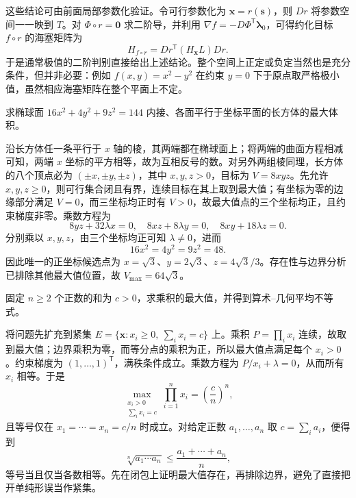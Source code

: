 这些结论可由前面局部参数化验证。令可行参数化为 $\boldsymbol x=r(\boldsymbol s)$，则 $Dr$ 将参数空间一一映到 $T$。对 $\Phi\circ r=\boldsymbol0$ 求二阶导，并利用 $\nabla f=-D\Phi^{\mathsf T}\boldsymbol\lambda_0$，可得约化目标 $f\circ r$ 的海塞矩阵为
\[
    H_{f\circ r}=Dr^{\mathsf T}(H_{\boldsymbol x}L)Dr.
\]
于是通常极值的二阶判别直接给出上述结论。整个空间上正定或负定当然也是充分条件，但并非必要：例如 $f(x,y)=x^2-y^2$ 在约束 $y=0$ 下于原点取严格极小值，虽然相应海塞矩阵在整个平面上不定。

\begin{example}
\label{ex:ellipsoid-inscribed-box-ch14}
求椭球面 $16x^2+4y^2+9z^2=144$ 内接、各面平行于坐标平面的长方体的最大体积。
\end{example}
\begin{solve}
沿长方体任一条平行于 $x$ 轴的棱，其两端都在椭球面上；将两端的曲面方程相减可知，两端 $x$ 坐标的平方相等，故为互相反号的数。对另外两组棱同理，长方体的八个顶点必为 $(\pm x,\pm y,\pm z)$，其中 $x,y,z>0$，目标为 $V=8xyz$。先允许 $x,y,z\geq0$，则可行集合闭且有界，连续目标在其上取到最大值；有坐标为零的边缘部分满足 $V=0$，而三坐标均正时有 $V>0$，故最大值点的三个坐标均正，且约束梯度非零。乘数方程为
\[
    8yz+32\lambda x=0,\quad
    8xz+8\lambda y=0,\quad
    8xy+18\lambda z=0.
\]
分别乘以 $x,y,z$，由三个坐标均正可知 $\lambda\ne0$，进而
\[
    16x^2=4y^2=9z^2=48.
\]
因此唯一的正坐标候选点为 $x=\sqrt3$、$y=2\sqrt3$、$z=4\sqrt3/3$。存在性与边界分析已排除其他最大值位置，故 $V_{\max}=64\sqrt3$。
\end{solve}

\begin{example}
\label{ex:product-maximum-and-amgm-ch14}
固定 $n\geq2$ 个正数的和为 $c>0$，求乘积的最大值，并得到算术--几何平均不等式。
\end{example}
\begin{solve}
将问题先扩充到紧集 $E=\{\boldsymbol x:x_i\geq0,\ \sum_i x_i=c\}$ 上。乘积 $P=\prod_i x_i$ 连续，故取到最大值；边界乘积为零，而等分点的乘积为正，所以最大值点满足每个 $x_i>0$。约束梯度为 $(1,\ldots,1)^{\mathsf T}$，满秩条件成立。乘数方程为 $P/x_i+\lambda=0$，从而所有 $x_i$ 相等。于是
\[
    \max_{\substack{x_i>0\\\sum_i x_i=c}}\prod_{i=1}^n x_i
       =\left(\frac cn\right)^n,
\]
且等号仅在 $x_1=\cdots=x_n=c/n$ 时成立。对给定正数 $a_1,\ldots,a_n$ 取 $c=\sum_i a_i$，便得到
\[
    \sqrt[n]{a_1\cdots a_n}\leq\frac{a_1+\cdots+a_n}{n},
\]
等号当且仅当各数相等。先在闭包上证明最大值存在，再排除边界，避免了直接把开单纯形误当作紧集。
\end{solve}

